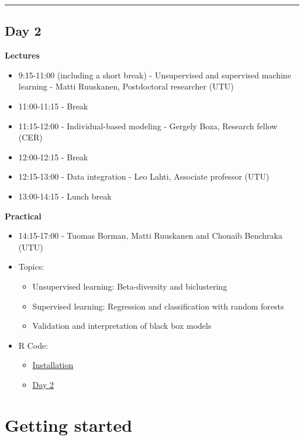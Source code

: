 \documentclass[
  oneside]{book}
\begin{document}
\begin{center}\rule{0.5\linewidth}{0.5pt}\end{center}

\hypertarget{day-2}{%
\section{Day 2}\label{day-2}}

\textbf{Lectures}

\begin{itemize}
\item
  9:15-11:00 (including a short break) - Unsupervised and supervised machine learning - Matti Ruuskanen, Postdoctoral researcher (UTU)
\item
  11:00-11:15 - Break
\item
  11:15-12:00 - Individual-based modeling - Gergely Boza, Research fellow (CER)
\item
  12:00-12:15 - Break
\item
  12:15-13:00 - Data integration - Leo Lahti, Associate professor (UTU)
\item
  13:00-14:15 - Lunch break
\end{itemize}

\textbf{Practical}

\begin{itemize}
\item
  14:15-17:00 - Tuomas Borman, Matti Ruuskanen and Chouaib Benchraka (UTU)
\item
  Topics:

  \begin{itemize}
  \item
    Unsupervised learning: Beta-diversity and biclustering
  \item
    Supervised learning: Regression and classification with random forests
  \item
    Validation and interpretation of black box models
  \end{itemize}
\item
  R Code:

  \begin{itemize}
  \item
    \href{install_script.R}{Installation}
  \item
    \href{Day_2.R}{Day 2}
  \end{itemize}
\end{itemize}

\hypertarget{getting-started}{%
\chapter{Getting started}\label{getting-started}}
\end{document}
